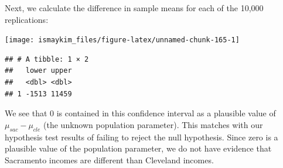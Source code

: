 \documentclass[]{tufte-book}
\newenvironment{Shaded}{\begin{snugshade}}{\end{snugshade}}
\newcommand{\KeywordTok}[1]{\textcolor[rgb]{0.13,0.29,0.53}{\textbf{{#1}}}}
\newcommand{\DataTypeTok}[1]{\textcolor[rgb]{0.13,0.29,0.53}{{#1}}}
\newcommand{\DecValTok}[1]{\textcolor[rgb]{0.00,0.00,0.81}{{#1}}}
\newcommand{\FloatTok}[1]{\textcolor[rgb]{0.00,0.00,0.81}{{#1}}}
\newcommand{\StringTok}[1]{\textcolor[rgb]{0.31,0.60,0.02}{{#1}}}
\newcommand{\NormalTok}[1]{{#1}}
\begin{document}
Next, we calculate the difference in sample means for each of the 10,000
replications:

\begin{Shaded}
\end{Shaded}

\begin{Shaded}
\end{Shaded}

\begin{center}\texttt{[image: ismaykim\_files/figure-latex/unnamed-chunk-165-1]} \end{center}

\begin{Shaded}
\end{Shaded}

\begin{verbatim}
## # A tibble: 1 × 2
##   lower upper
##   <dbl> <dbl>
## 1 -1513 11459
\end{verbatim}

We see that 0 is contained in this confidence interval as a plausible
value of \(\mu_{sac} - \mu_{cle}\) (the unknown population parameter).
This matches with our hypothesis test results of failing to reject the
null hypothesis. Since zero is a plausible value of the population
parameter, we do not have evidence that Sacramento incomes are different
than Cleveland incomes.
\end{document}
